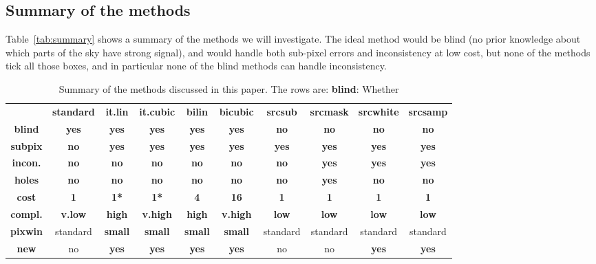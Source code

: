 \documentclass{article}
\newcommand{\good}[1]{{\color{deepgreen}\textbf{#1}}}
\newcommand{\bad}[1]{{\color{red}\textbf{#1}}}
\newcommand{\medi}[1]{{\color{orange}\textbf{#1}}}
\newcommand{\mixed}[1]{{\color{blue}\textbf{#1}}}
\newcommand{\neutral}[1]{#1}
\newcommand{\dfn}[1]{\textbf{#1}}
\begin{document}
\subsection{Summary of the methods}
Table~\ref{tab:summary} shows a summary of the methods we will investigate. The ideal method would be
blind (no prior knowledge about which parts of the sky have strong signal),
and would handle both sub-pixel errors and inconsistency at low cost, but none of the methods
tick all those boxes, and in particular none of the blind methods can handle inconsistency.

\begin{table}
	\centering
	\begin{tabular}{cccccccccc}
			&
			\bf standard &
			\bf it.lin &
			\bf it.cubic &
			\bf bilin &
			\bf bicubic &
			\bf srcsub &
			\bf srcmask &
			\bf srcwhite &
			\bf srcsamp
		\\
			\bf blind &
			\good{yes} &
			\good{yes} &
			\good{yes} &
			\good{yes} &
			\good{yes} &
			\bad{no} &
			\bad{no} &
			\bad{no} &
			\bad{no}
		\\
			\bf subpix & 
			\bad{no} &
			\good{yes} &
			\good{yes} &
			\good{yes} &
			\good{yes} &
			\good{yes} &
			\good{yes} &
			\good{yes} &
			\good{yes}
		\\
			\bf incon. &
			\bad{no} &
			\bad{no} &
			\bad{no} &
			\bad{no} &
			\bad{no} &
			\bad{no} &
			\good{yes} &
			\good{yes} &
			\good{yes}
		\\
			\bf holes &
			\good{no} &
			\good{no} &
			\good{no} &
			\good{no} &
			\good{no} &
			\good{no} &
			\bad{yes} &
			\good{no} &
			\good{no}
		\\
			\bf cost &
			\good{1} &
			\good{1*} &
			\good{1*} &
			\bad{4} &
			\bad{16} &
			\good{1} &
			\good{1} &
			\good{1} &
			\good{1}
		\\
			\bf compl. &
			\good{v.low} &
			\medi{high} &
			\bad{v.high} &
			\medi{high} &
			\bad{v.high} &
			\good{low} &
			\good{low} &
			\good{low} &
			\good{low}
		\\
			\bf pixwin &
			\neutral{standard} &
			\mixed{small} &
			\mixed{small} &
			\mixed{small} &
			\mixed{small} &
			\neutral{standard} &
			\neutral{standard} &
			\neutral{standard} &
			\neutral{standard}
		\\
			\bf new &
			\neutral{no} &
			\mixed{yes} &
			\mixed{yes} &
			\mixed{yes} &
			\mixed{yes} &
			\neutral{no} &
			\neutral{no} &
			\mixed{yes} &
			\mixed{yes}
	\end{tabular}
	\caption{Summary of the methods discussed in this paper. The rows are: \dfn{blind}: Whether
}
\end{table}
\end{document}
